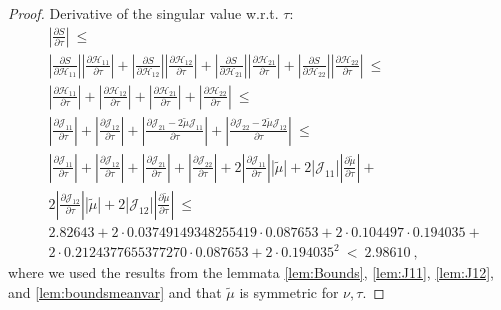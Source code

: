 \documentclass{article}
\newcommand\munn{{\tilde \mu}}
\renewcommand{\leq}{\leqslant}
\begin{document}
\begin{proof}
Derivative of the singular value w.r.t. $\tau$:
\begin{align}
&\left|\frac{\partial S}{\partial \tau}\right| \ \leq \\\nonumber
&\left|\frac{\partial S}{\partial {\mathcal H}_{11}}\right| \left|\frac{\partial {\mathcal H}_{11}}{\partial \tau}\right| + 
\left| \frac{\partial S}{\partial {\mathcal H}_{12}}\right| \left|\frac{\partial {\mathcal H}_{12}}{\partial \tau}\right| + 
\left|\frac{\partial S}{\partial {\mathcal H}_{21}}\right| \left|\frac{\partial {\mathcal H}_{21}}{\partial \tau}\right| + 
\left| \frac{\partial S}{\partial {\mathcal H}_{22}}\right| \left|\frac{\partial {\mathcal H}_{22}}{\partial \tau}\right|
\ \leq \\\nonumber
&\left|\frac{\partial {\mathcal H}_{11}}{\partial \tau}\right| + 
\left|\frac{\partial {\mathcal H}_{12}}{\partial \tau} \right| + 
\left|\frac{\partial {\mathcal H}_{21}}{\partial \tau} \right|+ 
\left|\frac{\partial {\mathcal H}_{22}}{\partial \tau}\right|
\ \leq \\\nonumber
&\left|\frac{\partial {\mathcal J}_{11}}{\partial \tau}\right| + 
\left|\frac{\partial {\mathcal J}_{12}}{\partial \tau} \right| + 
\left|\frac{\partial {\mathcal J}_{21} - 2 \munn {\mathcal J}_{11}}{\partial \tau} \right|+ 
\left|\frac{\partial {\mathcal J}_{22} - 2 \munn {\mathcal J}_{12}}{\partial \tau}\right|
\ \leq \\\nonumber
&\left|\frac{\partial {\mathcal J}_{11}}{\partial \tau}\right| +
\left|\frac{\partial {\mathcal J}_{12}}{\partial \tau} \right| + 
\left|\frac{\partial {\mathcal J}_{21}}{\partial \tau} \right|+ 
\left|\frac{\partial {\mathcal J}_{22}}{\partial \tau}\right| +
2 \left|\frac{\partial {\mathcal J}_{11}}{\partial \tau} \right| \left| \munn\right|  + 2 \left| \mathcal{J}_{11} \right|  \left| \frac{\partial \munn}{\partial \tau}\right|+ \nonumber \\
& \left. 2 \left|\frac{\partial {\mathcal J}_{12}}{\partial \tau}\right| \left| \munn\right|   + 2 \left| \mathcal{J}_{12} \right|  \left| \frac{\partial \munn}{\partial \tau}\right| \right.
\ \leq \\\nonumber
& 2.82643 +2 \cdot 0.03749149348255419 \cdot 0.087653 + 2\cdot 0.104497 \cdot 0.194035 + \\ \nonumber
& 2\cdot 0.2124377655377270 \cdot 0.087653 + 2\cdot 0.194035^2  \ < \ 2.98610 \ ,
\end{align}
where we used the results from the lemmata \ref{lem:Bounds}, \ref{lem:J11}, \ref{lem:J12}, and \ref{lem:boundsmeanvar} and that
$\munn$ is symmetric for  $\nu, \tau$.

\end{proof}
\end{document}
